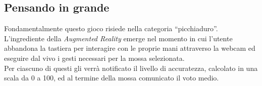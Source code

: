 \documentclass[a4paper,10pt, twocolumn]{article}
\begin{document}
  \subsection{Pensando in grande}
  Fondamentalmente questo gioco risiede nella categoria ``picchiaduro''.
  L'ingrediente della \emph{Augmented Reality} emerge nel
  momento in cui l'utente abbandona la tastiera per interagire con le proprie mani 
  attraverso la webcam ed eseguire dal vivo i gesti necessari per la mossa selezionata.\\
  Per ciascuno di questi gli verr\`{a} notificato il livello di accuratezza, 
  calcolato in una scala da 0 a 100, ed al termine della mossa comunicato il voto medio.
  
\end{document}
